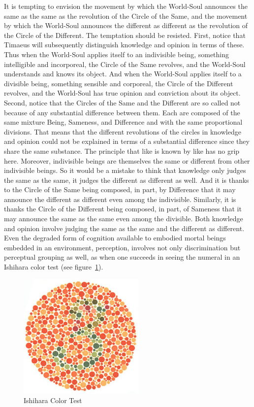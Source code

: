 It is tempting to envision the movement by which the World-Soul announces the same as the same as the revolution of the Circle of the Same, and the movement by which the World-Soul announces the different as different as the revolution of the Circle of the Different. The temptation should be resisted. First, notice that Timaeus will subsequently distinguish knowledge and opinion in terms of these. Thus when the World-Soul applies itself to an indivisible being, something intelligible and incorporeal, the Circle of the Same revolves, and the World-Soul understands and knows its object. And when the World-Soul applies itself to a divisible being, something sensible and corporeal, the Circle of the Different revolves, and the World-Soul has true opinion and conviction about its object. Second, notice that the Circles of the Same and the Different are so called not because of any substantial difference between them. Each are composed of the same mixture Being, Sameness, and Difference and with the same proportional divisions. That means that the different revolutions of the circles in knowledge and opinion could not be explained in terms of a substantial difference since they share the same substance. The principle that like is known by like has no grip here. Moreover, indivisible beings are themselves the same or different from other indivisible beings. So it would be a mistake to think that knowledge only judges the same as the same, it judges the different as different as well. And it is thanks to the Circle of the Same being composed, in part, by Difference that it may announce the different as different even among the indivisible. Similarly, it is thanks the Circle of the Different being composed, in part, of Sameness that it may announce the same as the same even among the divisible. Both knowledge and opinion involve judging the same as the same and the different as different. Even the degraded form of cognition available to embodied mortal beings embedded in an environment, perception, involves not only discrimination but perceptual grouping as well, as when one succeeds in seeing the numeral in an Ishihara color test (see figure~\ref{fig:ishihara}).

\begin{figure}[htbp]
	\centering
		\includegraphics[scale=1.5]{graphics/ishihara.jpg}
	\caption{Ishihara Color Test}
	\label{fig:ishihara}
\end{figure}

